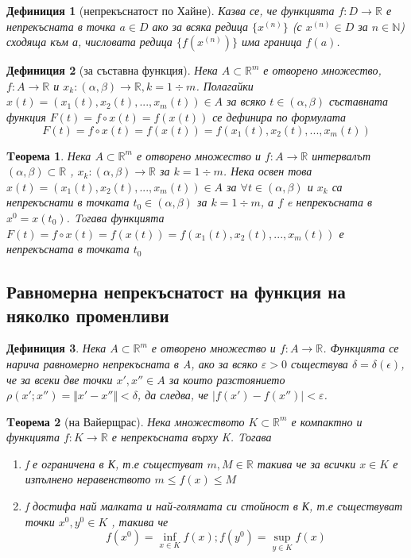 \documentclass[a4paper,fleqn,12pt]{article}
\newtheorem{theorem}{Tеорема}[subsection]
\newtheorem{definition}{Дефиниция}[subsection]
\theoremstyle{definition}
\begin{document}
\begin{definition}[непрекъснатост по Хайне]
Казва се, че функцията $f: D \to \mathbb{R}$ е непрекъсната в точка $a \in D$ ако за всяка редица  $\{x^{(n)}\}$ (с $x^{(n)} \in D$ за $n \in \mathbb{N}$) сходяща към а, числовата редица $\{f(x^{(n)})\}$ има граница $f(a)$. 
\end{definition}

\begin{definition}[за съставна функция]
Нека $A \subset \mathbb{R}^m$ е отворено множество, $f: A \to \mathbb{R}$ и $x_k: (\alpha, \beta) \to \mathbb{R}, k = 1 \div m$. Полагайки  $x(t) = (x_1(t), x_2(t), ... , x_m(t)) \in A$ за всяко $t \in (\alpha, \beta)$ съставната функция $F(t) = f \circ x(t) = f(x(t))$ се дефинира по формулата 
$$F(t) = f \circ x(t) = f(x(t)) = f(x_1(t), x_2(t), ... , x_m(t))$$
\end{definition}

\begin{theorem}
Нека $A \subset \mathbb{R}^m$ е отворено множество и $f: A \to \mathbb{R}$ интервалът $(\alpha, \beta) \subset \mathbb{R}$ , $x_k: (\alpha, \beta) \to \mathbb{R} $ за $k = 1 \div m$. Нека освен това $x(t) = (x_1(t), x_2(t), ... , x_m(t)) \in A$ за $\forall t \in (\alpha, \beta)$ и $x_k$ са непрекъснати в точката $t_0 \in (\alpha, \beta) $  за $k = 1 \div m$, а $f$ e непрекъсната в $x^0 = x(t_0)$. Toгава функцията $F(t) = f \circ x(t) = f(x(t)) = f(x_1(t), x_2(t), ... , x_m(t))$ е непрекъсната в точката $t_0$
\end{theorem}

\subsection{Равномерна непрекъснатост на функция на няколко променливи}
\begin{definition}
Нека $A \subset \mathbb{R}^m$ е отворено множество и $f: A \to \mathbb{R}$. Функцията се нарича равномерно непрекъсната в A, ако за  всяко $\varepsilon > 0$ съществува $\delta = \delta(\epsilon)$, че за всеки две точки $x', x'' \in A$ за които разстоянието $\rho(x';x'') =\Vert x' - x'' \Vert < \delta $, да следва, че $\vert f(x') - f(x'') \vert  < \varepsilon$.
\end{definition}

\begin{theorem}[на Вайерщрас]
Нека множеството $K \subset \mathbb{R}^m$ е компактно и функцията $f: K \to \mathbb{R}$ е непрекъсната върху K. Tогава 

\begin{enumerate}
		\item f е ограничена в К, т.е същестуват $m, M \in \mathbb{R}$ такива че за всички $x \in K$ е изпълнено неравенството
$m \leq f(x) \leq M$
		\item f достифа най малката и най-голямата си стойност в К, т.е съществуват точки $x^0, y^0 \in K$ , такива че
$$f(x^0) = \inf _{x \in K}f(x) ; f(y^0) = \sup_{y \in K} f(x)$$
\end{enumerate}

\end{theorem}
\end{document}
